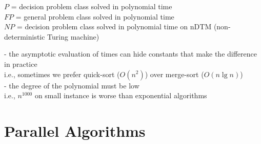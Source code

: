 $P$ = decision problem class solved in polynomial time\\
$FP$ = general problem class solved in polynomial time\\
$NP$ = decision problem class solved in polynomial time on nDTM (non-deterministic Turing machine)

\begin{remark}
 - the asymptotic evaluation of times can hide constants that make the difference in practice\\
  i.e., sometimes we prefer quick-sort ($O(n^2)$) over merge-sort ($O(n\lg{n})$)\\
 - the degree of the polynomial must be low\\
  i.e., $n^1000$ on small instance is worse than exponential algorithms\\
\end{remark}

\section{Parallel Algorithms}
